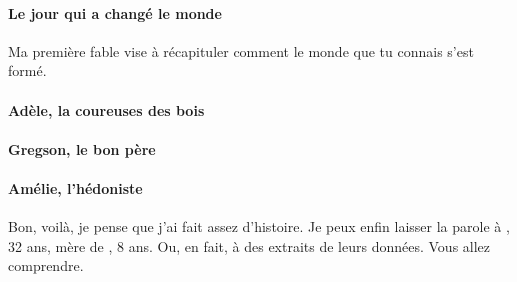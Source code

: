 \paragraph{Le jour qui a changé le monde}

Ma première fable vise à récapituler comment le monde que tu connais s'est formé.



\paragraph{Adèle, la coureuses des bois}

\paragraph{Gregson, le bon père} 

\paragraph{Amélie, l'hédoniste}

Bon, voilà, je pense que j'ai fait assez d'histoire. Je peux enfin laisser la
parole à \nomMere, 32 ans, mère de \nomEnfant, 8 ans. Ou, en fait, à des
extraits de leurs données. Vous allez comprendre.


